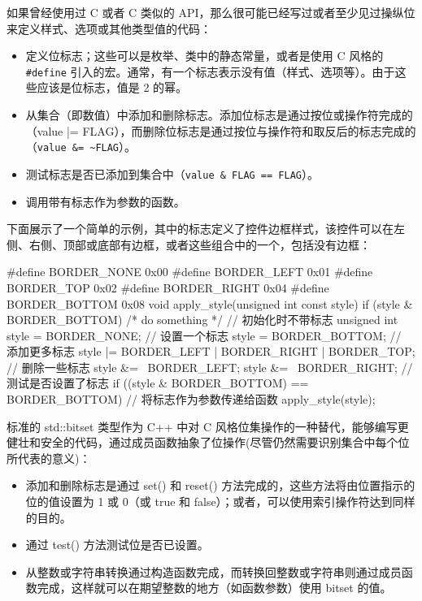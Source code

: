 
如果曾经使用过 C 或者 C 类似的 API，那么很可能已经写过或者至少见过操纵位来定义样式、选项或其他类型值的代码：

\begin{itemize}
\item
定义位标志；这些可以是枚举、类中的静态常量，或者是使用 C 风格的 \verb|#define| 引入的宏。通常，有一个标志表示没有值（样式、选项等）。由于这些应该是位标志，值是 2 的幂。

\item
从集合（即数值）中添加和删除标志。添加位标志是通过按位或操作符完成的（value |= FLAG），而删除位标志是通过按位与操作符和取反后的标志完成的（\verb|value &= ~FLAG|）。

\item
测试标志是否已添加到集合中（\verb|value & FLAG == FLAG|）。

\item
调用带有标志作为参数的函数。
\end{itemize}

下面展示了一个简单的示例，其中的标志定义了控件边框样式，该控件可以在左侧、右侧、顶部或底部有边框，或者这些组合中的一个，包括没有边框：

\begin{cpp}
#define BORDER_NONE   0x00
#define BORDER_LEFT   0x01
#define BORDER_TOP    0x02
#define BORDER_RIGHT  0x04
#define BORDER_BOTTOM 0x08
void apply_style(unsigned int const style)
{
    if (style & BORDER_BOTTOM) { /* do something */ }
}
// 初始化时不带标志
unsigned int style = BORDER_NONE;
// 设置一个标志
style = BORDER_BOTTOM;
// 添加更多标志
style |= BORDER_LEFT | BORDER_RIGHT | BORDER_TOP;
// 删除一些标志
style &= ~BORDER_LEFT;
style &= ~BORDER_RIGHT;
// 测试是否设置了标志
if ((style & BORDER_BOTTOM) == BORDER_BOTTOM) {}
// 将标志作为参数传递给函数
apply_style(style);
\end{cpp}

标准的 std::bitset 类型作为 C++ 中对 C 风格位集操作的一种替代，能够编写更健壮和安全的代码，通过成员函数抽象了位操作(尽管仍然需要识别集合中每个位所代表的意义)：

\begin{itemize}
\item
添加和删除标志是通过 set() 和 reset() 方法完成的，这些方法将由位置指示的位的值设置为 1 或 0（或 true 和 false）；或者，可以使用索引操作符达到同样的目的。

\item
通过 test() 方法测试位是否已设置。

\item
从整数或字符串转换通过构造函数完成，而转换回整数或字符串则通过成员函数完成，这样就可以在期望整数的地方（如函数参数）使用 bitset 的值。
\end{itemize}

